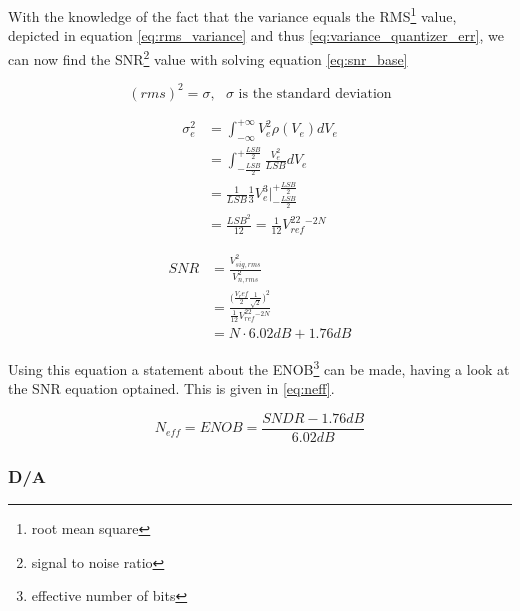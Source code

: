 With the knowledge of the fact that the variance equals the RMS\footnote{root mean square} value, depicted in equation \ref{eq:rms_variance} and thus \ref{eq:variance_quantizer_err}, we can now find the SNR\footnote{signal to noise ratio} value with solving equation \ref{eq:snr_base}

\begin{equation}
    (rms)^2 = \sigma,\text{ $\sigma$ is the standard deviation}
    \label{eq:rms_variance}
\end{equation}

\begin{align}
    \sigma_e^2 &= \int_{-\infty}^{+\infty}V_e^2\rho(V_e)dV_e \\
    &= \int_{-\frac{LSB}{2}}^{+\frac{LSB}{2}}\frac{V_e^2}{LSB}dV_e \\
    &= \frac{1}{LSB}\frac{1}{3}V_e^3\Big|_{-\frac{LSB}{2}}^{+\frac{LSB}{2}} \\
    &= \frac{LSB^2}{12} = \frac{1}{12}V_{ref}^22^{-2N}
    \label{eq:variance_quantizer_err}
\end{align}

\begin{align}
    SNR &= \frac{V_{sig, rms}^2}{V_{n, rms}^2} \\
    &= \frac{\Big(\frac{V_ref}{2}\frac{1}{\sqrt{2}}\Big)^2}{\frac{1}{12}V_{ref}^22^{-2N}} \\
    &= N\cdot 6.02dB + 1.76dB
    \label{eq:snr_base}
\end{align}

Using this equation a statement about the ENOB\footnote{effective number of bits} can be made, having a look at the SNR equation optained. This is given in \ref{eq:neff}.

\begin{equation}
    N_{eff} = ENOB = \frac{SNDR - 1.76dB}{6.02dB}
    \label{eq:neff}
\end{equation}

\subsubsection[chain2DA]{ D/A}

